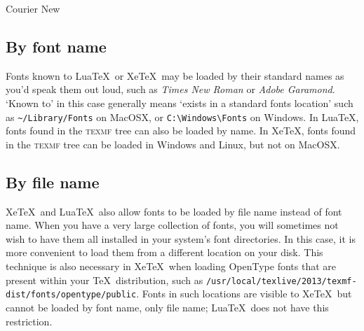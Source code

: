 \documentclass{article}
\begin{document}
{\LARGE Courier New }

\subsection{By font name}
Fonts known to Lua\TeX\ or Xe\TeX\ may be loaded by their standard names as
you'd speak them out loud, such as \emph{Times New Roman} or
\emph{Adobe Garamond}.
`Known to' in this case generally means `exists in a standard fonts location'
such as \verb|~/Library/Fonts| on MacOSX, or \verb|C:\Windows\Fonts| on Windows.
In Lua\TeX, fonts found in the \textsc{texmf} tree can also be loaded by name.
In Xe\TeX, fonts found in the \textsc{texmf} tree can be loaded in Windows and Linux,
but not on MacOSX.


\subsection{By file name}
Xe\TeX\ and Lua\TeX\ also allow fonts to be loaded by file name instead of font name.
When you have a very large collection of fonts, you will sometimes not
wish to have them all installed in your system's font directories.
In this case, it is more convenient to load them from a different location on your disk.
This technique is also necessary in Xe\TeX\ when loading OpenType fonts that are present within your \TeX\ distribution, such as \verb|/usr/local/texlive/2013/texmf-dist/fonts/opentype/public|.
Fonts in such locations are visible to Xe\TeX\ but cannot be loaded by font name, only file name; Lua\TeX\ does not have this restriction.
\end{document}
